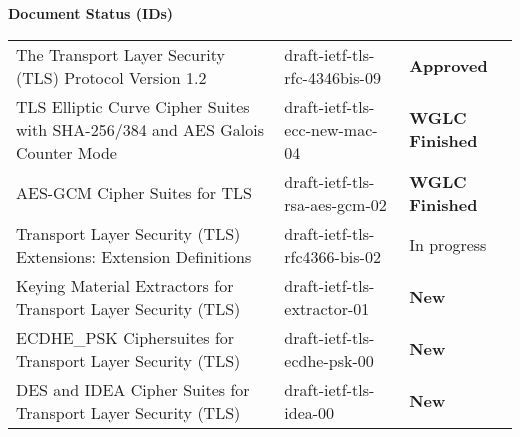 \documentclass[helvetica]{seminar}
\newcommand{\heading}[1]{%
  \begin{center} 
    \large\bf 
    #1 
  \end{center} 
  \vspace{.4 in}}
\begin{document}
\begin{slide}
\heading{Document Status (IDs)}

{\tiny
\begin{tabular}{|p{1.5 in}|p{1.4 in}|p{.7 in}|}
\hline
The Transport Layer Security (TLS) Protocol Version 1.2 & draft-ietf-tls-rfc-4346bis-09 & \textbf{Approved} \\
TLS Elliptic Curve Cipher Suites with SHA-256/384 and AES Galois Counter Mode & draft-ietf-tls-ecc-new-mac-04 & \textbf{WGLC Finished} \\
AES-GCM Cipher Suites for TLS & draft-ietf-tls-rsa-aes-gcm-02 & \textbf{WGLC Finished} \\
Transport Layer Security (TLS) Extensions: Extension Definitions & draft-ietf-tls-rfc4366-bis-02 & In progress \\
Keying Material Extractors for Transport Layer Security (TLS) & draft-ietf-tls-extractor-01 & \textbf{New} \\
ECDHE\_PSK Ciphersuites for Transport Layer Security (TLS) & draft-ietf-tls-ecdhe-psk-00 & \textbf{New} \\
DES and IDEA Cipher Suites for Transport Layer Security (TLS) & draft-ietf-tls-idea-00 & \textbf{New} \\
\hline
\end{tabular}
}


\end{slide}
\end{document}

